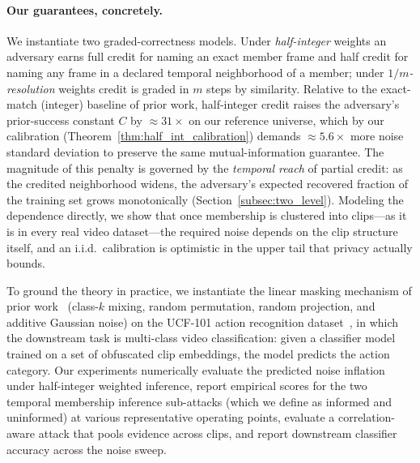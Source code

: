 \documentclass[sigconf,anonymous, review]{acmart}
\begin{document}
\paragraph{Our guarantees, concretely.}
We instantiate two graded-correctness models. Under \emph{half-integer} weights an adversary earns full credit for naming an exact member frame and half credit for naming any frame in a declared temporal neighborhood of a member; under \emph{$1/m$-resolution} weights credit is graded in $m$ steps by similarity. Relative to the exact-match (integer) baseline of prior work, half-integer credit raises the adversary's prior-success constant $C$ by $\approx 31\times$ on our reference universe, which by our calibration (Theorem~\ref{thm:half_int_calibration}) demands $\approx 5.6\times$ more noise standard deviation to preserve the same mutual-information guarantee. The magnitude of this penalty is governed by the \emph{temporal reach} of partial credit: as the credited neighborhood widens, the adversary's expected recovered fraction of the training set grows monotonically (Section~\ref{subsec:two_level}). Modeling the dependence directly, we show that once membership is clustered into clips---as it is in every real video dataset---the required noise depends on the clip structure itself, and an i.i.d.\ calibration is optimistic in the upper tail that privacy actually bounds.

To ground the theory in practice, we instantiate the linear masking mechanism of prior work~\cite{xiao2024formal} (class-$k$ mixing, random permutation, random projection, and additive Gaussian noise) on the UCF-101 action recognition dataset~\cite{soomro2012ucf101}, in which the downstream task is multi-class video classification: given a classifier model trained on a set of obfuscated clip embeddings, the model predicts the action category. Our experiments numerically evaluate the predicted noise inflation under half-integer weighted inference, report empirical scores for the two temporal membership inference sub-attacks (which we define as informed and uninformed) at various representative operating points, evaluate a correlation-aware attack that pools evidence across clips, and report downstream classifier accuracy across the noise sweep.
\end{document}
